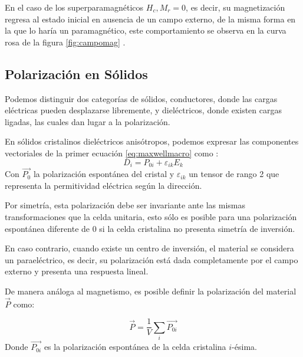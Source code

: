 \documentclass[../main.tex]{subfiles}
\begin{document}
En el caso de los superparamagnéticos $H_c,M_r=0$, es decir, su magnetización regresa al estado inicial en ausencia de un campo externo, de la misma forma en la que lo haría un paramagnético, este comportamiento se observa en la curva rosa de la figura \ref{fig:campomag} \cite{coey2010magnetism}.
\subsection{Polarización en Sólidos}
Podemos distinguir dos categorías de sólidos, conductores, donde las cargas eléctricas pueden desplazarse libremente, y dieléctricos, donde existen cargas ligadas, las cuales dan lugar a la polarización.

En sólidos cristalinos dieléctricos anisótropos, podemos expresar las componentes vectoriales de la primer ecuación \ref{eq:maxwellmacro} como \cite{Landau1984}:
\begin{equation}
    D_i=P_{0i}+\varepsilon_{ik}E_k
    \label{eq:macroelec}
\end{equation}
Con $\vec{P_{0}}$ la polarización espontánea del cristal y $\varepsilon_{ik}$ un tensor de rango 2 que representa la permitividad eléctrica según la dirección.

Por simetría, esta polarización debe ser invariante ante las mismas transformaciones que la celda unitaria, esto sólo es posible para una polarización espontánea diferente de 0 si la celda cristalina no presenta simetría de inversión.

En caso contrario, cuando existe un centro de inversión, el material se considera un paraeléctrico, es decir, su polarización está dada completamente por el campo externo y presenta una respuesta lineal.

De manera análoga al magnetismo, es posible definir la polarización del material $\vec{P}$ como:

\begin{equation}
    \vec{P}=\dfrac{1}{V}\sum_{i}\vec{P_{0i}}
    \label{eq:polarizacionmicromacro}
\end{equation}
Donde $\vec{P_{0i}}$ es la polarización espontánea de la celda cristalina $i$-ésima.
\end{document}
